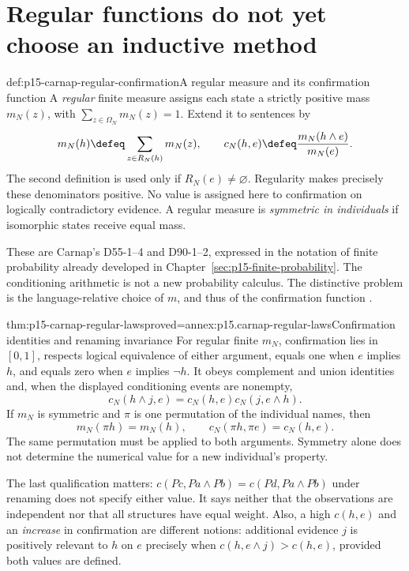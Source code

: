 \section{Regular functions do not yet choose an inductive method}
\label{sec:p15-carnap-regular}

\begin{hbdefinition}{def:p15-carnap-regular-confirmation}{A regular measure and its confirmation function}
A \emph{regular} finite measure assigns each state a strictly positive
mass \(m_N(z)\), with \(\sum_{z\in\Omega_N}m_N(z)=1\).
Extend it to sentences by
\[
 m_N(h)\defeq\sum_{z\in R_N(h)}m_N(z),\qquad
 c_N(h,e)\defeq\frac{m_N(h\land e)}{m_N(e)}.
\]
The second definition is used only if \(R_N(e)\ne\varnothing\).
Regularity makes precisely these denominators positive. No value is
assigned here to confirmation on logically contradictory evidence.
A regular measure is \emph{symmetric in individuals} if isomorphic
states receive equal mass.
\end{hbdefinition}

These are Carnap's D55-1--4 and D90-1--2, expressed in the notation of
finite probability already developed in
Chapter~\ref{sec:p15-finite-probability}. The conditioning arithmetic is
not a new probability calculus. The distinctive problem is the
language-relative choice of \(m\), and thus of the confirmation function
\cite[secs.~55, 59, 90--91]{Carnap1950Probability}.

\begin{hbtheorem}{thm:p15-carnap-regular-laws}{proved=annex:p15.carnap-regular-laws}{Confirmation identities and renaming invariance}
For regular finite \(m_N\), confirmation lies in \([0,1]\), respects
logical equivalence of either argument, equals one when \(e\) implies
\(h\), and equals zero when \(e\) implies \(\neg h\).
It obeys complement and union identities and, when the displayed
conditioning events are nonempty,
\[
 c_N(h\land j,e)=c_N(h,e)c_N(j,e\land h).
\]
If \(m_N\) is symmetric and \(\pi\) is one permutation of the
individual names, then
\[
 m_N(\pi h)=m_N(h),\qquad
 c_N(\pi h,\pi e)=c_N(h,e).
\]
The same permutation must be applied to both arguments. Symmetry alone
does not determine the numerical value for a new individual's property.
\end{hbtheorem}

The last qualification matters: \(c(Pc,Pa\land Pb)=c(Pd,Pa\land Pb)\)
under renaming does not specify either value. It says neither that the
observations are independent nor that all structures have equal weight.
Also, a high \(c(h,e)\) and an \emph{increase} in confirmation are
different notions: additional evidence \(j\) is positively relevant to
\(h\) on \(e\) precisely when \(c(h,e\land j)>c(h,e)\), provided
both values are defined.


